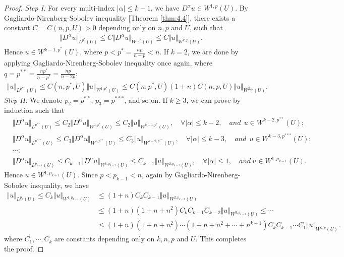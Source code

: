 \documentclass{article}
\numberwithin{equation}{section}
\theoremstyle{plain}
\theoremstyle{definition}
\begin{document}
\begin{proof}
\textit{Step I:} For every multi-index $\vert\alpha\vert\leq k-1$, we have $D^\alpha u\in W^{1,p}(U)$. By Gagliardo-Nirenberg-Sobolev inequality [Theorem \ref{thm:4.4}], there exists a constant $C=C(n,p,U)>0$ depending only on $n,p$ and $U$, such that
\begin{align*}
	\Vert D^\alpha u\Vert_{L^{p^*}(U)}\leq C\Vert D^\alpha u\Vert_{W^{1,p}(U)}\leq C\Vert u\Vert_{W^{k,p}(U)}.
\end{align*}
Hence $u\in W^{k-1,p^*}(U)$, where $p<p^*=\frac{np}{n-p}<n$. If $k=2$, we are done by applying Gagliardo-Nirenberg-Sobolev inequality once again, where $q=p^{**}=\frac{np^*}{n-p^*}=\frac{np}{n-2p}$:
\begin{align*}
	\Vert u\Vert_{L^{p^{**}}(U)}\leq C(n,p^*,U)\Vert u\Vert_{W^{1,p^*}(U)}\leq C(n,p^*,U)(1+n)C(n,p,U)\Vert u\Vert_{W^{2,p}(U)}.
\end{align*}
\textit{Step II:} We denote $p_2=p^{**}$, $p_3=p^{***}$, and so on. If $k\geq 3$, we can prove by induction such that
\begin{align*}
	&\Vert D^\alpha u\Vert_{L^{p^{**}}(U)}\leq C_2\Vert D^\alpha u\Vert_{W^{1,p^*}(U)}\leq C_2\Vert u\Vert_{W^{{k-1},p^*}(U)},\quad\forall\vert\alpha\vert\leq k-2,\quad\textit{and}\ \ u\in W^{k-2,p^{**}}(U);\\
	&\Vert D^\alpha u\Vert_{L^{p^{***}}(U)}\leq C_3\Vert D^\alpha u\Vert_{W^{1,p^{**}}(U)}\leq C_3\Vert u\Vert_{W^{{k-2},p^{**}}(U)},\quad\forall\vert\alpha\vert\leq k-3,\quad\textit{and}\ \ u\in W^{k-3,p^{***}}(U);\\
	&\cdots;\\
	&\Vert D^\alpha u\Vert_{L^{p_{k-1}}(U)}\leq C_{k-1}\Vert D^\alpha u\Vert_{W^{1,p_{k-2}}(U)}\leq C_{k-1}\Vert u\Vert_{W^{2,p_{k-2}}(U)},\quad\forall\vert\alpha\vert\leq 1,\quad\textit{and}\ u\in W^{1,p_{k-1}}(U).
\end{align*}
Hence $u\in W^{1,p_{k-1}}(U)$. Since $p<p_{k-1}<n$, again by Gagliardo-Nirenberg-Sobolev inequality, we have
\begin{align*}
	\Vert u\Vert_{L^{p_k}(U)}\leq C_k\Vert u\Vert_{W^{1,p_{k-1}}(U)}&\leq (1+n)C_kC_{k-1}\Vert u\Vert_{W^{2,p_{k-2}}(U)}\\
	&\leq (1+n)\left(1+n+n^2\right)C_kC_{k-1}C_{k-2}\Vert u\Vert_{W^{3,p_{k-3}}(U)}\leq\cdots\\
	&\leq (1+n)\left(1+n+n^2\right)\cdots\left(1+n+n^2+\cdots+n^{k-1}\right)C_kC_{k-1}\cdots C_1\Vert u\Vert_{W^{k,p}(U)}.
\end{align*}
where $C_1,\cdots,C_k$ are constants depending only on $k,n,p$ and $U$.  This completes the proof.
\end{proof}
\end{document}
